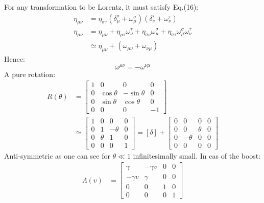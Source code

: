 \documentclass{article}
\begin{document}
For any transformation to be Lorentz, it must satisfy Eq.(16):
\begin{equation}
    \begin{split}
        \eta_{\mu\nu} & = \eta_{\sigma\tau}(\delta^\sigma_\mu + \omega^\sigma_\mu)(\delta^\tau_\nu + \omega^\tau_\nu)\\
        \eta_{\mu\nu} & = \eta_{\mu\nu} + \eta_{\mu\tau} \omega^\tau_\nu + \eta_{\sigma\nu}\omega^\sigma_\mu + \eta_{\sigma\tau}\omega^\sigma_\mu\omega^\tau_\nu \\
        & \simeq \eta_{\mu\nu} + (\omega_{\mu\nu} + \omega_{\nu\mu}) 
    \end{split}
\end{equation}
Hence:
\begin{equation}
    \omega^{\mu\nu} = - \omega^{\nu\mu}
\end{equation}
A pure rotation:
\begin{equation}
    \begin{split}
    R(\theta) & = \begin{bmatrix}
            1 & 0 & 0 & 0 \\
            0 & \cos{\theta} & -\sin{\theta} & 0 \\
            0 & \sin{\theta} & \cos{\theta} & 0 \\ 
            0 & 0 & 0 & -1
                \end{bmatrix} \\
    & \simeq \begin{bmatrix}
            1  & 0 & 0 & 0 \\
            0  & 1 & -\theta & 0\\
            0 & \theta & 1 & 0 \\
            0 & 0 & 0 & 1  
            \end{bmatrix} = [\delta] + \begin{bmatrix}
                0  & 0 & 0 & 0 \\
                0  & 0 & \theta & 0\\
                0 & -\theta & 0 & 0\\
                0 & 0 & 0 & 0
            \end{bmatrix}
    \end{split}
\end{equation}
Anti-symmetric as one can see for $\theta \ll 1$ infinitesimally small.
In cas of the boost:
\begin{equation}
    \begin{split}
        \Lambda(v) & = \begin{bmatrix}
                \gamma & -\gamma v & 0 & 0\\
                -\gamma v & \gamma & 0 & 0 \\
                0 & 0 & 1 & 0 \\
                0 & 0 & 0 & 1
                        \end{bmatrix}
    \end{split}
\end{equation}
\end{document}
